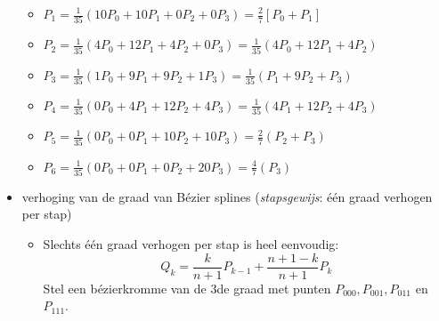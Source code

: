 \documentclass{report}
\newcommand{\vraag}[2]{
	\item #1
	
	#2
}
\begin{document}
\begin{itemize}
{\begin{itemize}
\begin{itemize}
				\item $P_1 = \frac{1}{35}(10P_0 + 10P_1 + 0P_2  + 0P_3) = \frac{2}{7}[P_0 + P_1]$ 
				\item $P_2 = \frac{1}{35}(4P_0  + 12P_1 + 4P_2  + 0P_3) = \frac{1}{35}(4P_0  + 12P_1 + 4P_2)$
				\item $P_3 = \frac{1}{35}(1P_0  + 9P_1 + 9P_2  + 1P_3) = \frac{1}{35}(P_1  + 9P_2 + P_3)$
				\item $P_4 = \frac{1}{35}(0P_0  + 4P_1 + 12P_2  + 4P_3) = \frac{1}{35}(4P_1  + 12P_2 + 4P_3)$
				\item $P_5 = \frac{1}{35}(0P_0  + 0P_1 + 10P_2  + 10P_3) = \frac{2}{7}(P_2 + P_3)$
				\item $P_6 = \frac{1}{35}(0P_0  + 0P_1 + 0P_2  + 20P_3) = \frac{4}{7}(P_3)$
			\end{itemize}
			
			
		\end{itemize}}
		\vraag{ verhoging van de graad van Bézier splines (\textit{stapsgewijs}: één graad verhogen per stap)}{
		\begin{itemize} 
			\item Slechts één graad verhogen per stap is heel eenvoudig:
			$$Q_k = \frac{k}{n + 1}P_{k - 1} + \frac{n + 1 - k}{n + 1}P_k$$
			Stel een bézierkromme van de 3de graad met punten $P_{000}, P_{001}, P_{011}$ en $P_{111}$.
			

\end{itemize}}
\end{itemize}
\end{document}
